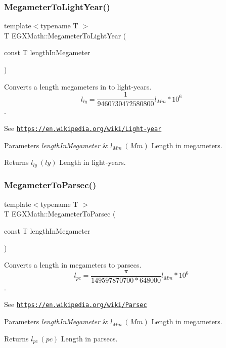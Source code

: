 \subsubsection{\texorpdfstring{Megameter\+To\+Light\+Year()}{MegameterToLightYear()}}
{\footnotesize\ttfamily template$<$typename T $>$ \\
T E\+G\+X\+Math\+::\+Megameter\+To\+Light\+Year (\begin{DoxyParamCaption}\item[{const T}]{length\+In\+Megameter }\end{DoxyParamCaption})}



Converts a length megameters in to light-\/years. \[ l_{ly}= \frac{1}{9460730472580800} l_{Mm} * 10^{6} \]. 

See \href{https://en.wikipedia.org/wiki/Light-year}{\tt https\+://en.\+wikipedia.\+org/wiki/\+Light-\/year} 
\begin{DoxyParams}{Parameters}
{\em length\+In\+Megameter} & $ l_{Mm}\ (Mm)$ Length in megameters. \\
\hline
\end{DoxyParams}
\begin{DoxyReturn}{Returns}
$ l_{ly}\ (ly)$ Length in light-\/years. 
\end{DoxyReturn}
\mbox{\label{group___e_g_x_math-_conversions-_length_conversions-_megameter-_astronomical_gaec774451afc484c6fa69d2cfcd3dbf06}} 
\subsubsection{\texorpdfstring{Megameter\+To\+Parsec()}{MegameterToParsec()}}
{\footnotesize\ttfamily template$<$typename T $>$ \\
T E\+G\+X\+Math\+::\+Megameter\+To\+Parsec (\begin{DoxyParamCaption}\item[{const T}]{length\+In\+Megameter }\end{DoxyParamCaption})}



Converts a length in megameters to parsecs. \[ l_{pc}=\frac{\pi}{149597870700 * 648000} l_{Mm} * 10^{6} \]. 

See \href{https://en.wikipedia.org/wiki/Parsec}{\tt https\+://en.\+wikipedia.\+org/wiki/\+Parsec} 
\begin{DoxyParams}{Parameters}
{\em length\+In\+Megameter} & $ l_{Mm}\ (Mm)$ Length in megameters. \\
\hline
\end{DoxyParams}
\begin{DoxyReturn}{Returns}
$ l_{pc}\ (pc)$ Length in parsecs. 
\end{DoxyReturn}
